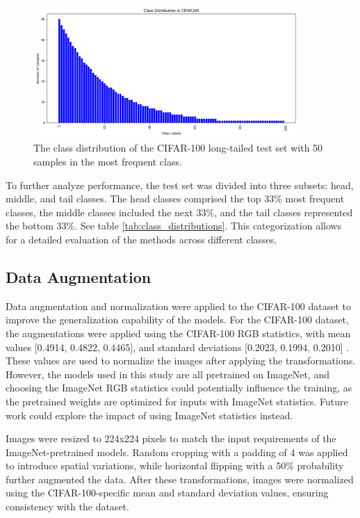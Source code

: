 \begin{figure}[h!]
    \centering
    \includegraphics[width=0.9\textwidth]{Images/Plots/cifar100_test_imb.png}
    \caption{The class distribution of the CIFAR-100 long-tailed test set with 50 samples in the most frequent class.}
    \label{fig:cifar100_test_imb}
\end{figure}

To further analyze performance, the test set was divided into three subsets: head, middle, and tail classes. The head classes comprised the top 33\% most frequent classes, the middle classes included the next 33\%, and the tail classes represented the bottom 33\%. See table \ref{tab:class_distributions}. This categorization allows for a detailed evaluation of the methods across different classes. 


\subsection{Data Augmentation}
Data augmentation and normalization were applied to the CIFAR-100 dataset to improve the generalization capability of the models. For the CIFAR-100 dataset, the augmentations were applied using the CIFAR-100 RGB statistics, with mean values [0.4914, 0.4822, 0.4465], and standard deviations [0.2023, 0.1994, 0.2010] \cite{cao2019learningimbalanceddatasetslabeldistributionaware}. These values are used to normalize the images after applying the transformations. However, the models used in this study are all pretrained on ImageNet, and choosing the ImageNet RGB statistics could potentially influence the training, as the pretrained weights are optimized for inputs with ImageNet statistics. Future work could explore the impact of using ImageNet statistics instead.

Images were resized to 224x224 pixels to match the input requirements of the ImageNet-pretrained models. Random cropping with a padding of 4 was applied to introduce spatial variations, while horizontal flipping with a 50\% probability further augmented the data. After these transformations, images were normalized using the CIFAR-100-specific mean and standard deviation values, ensuring consistency with the dataset.

